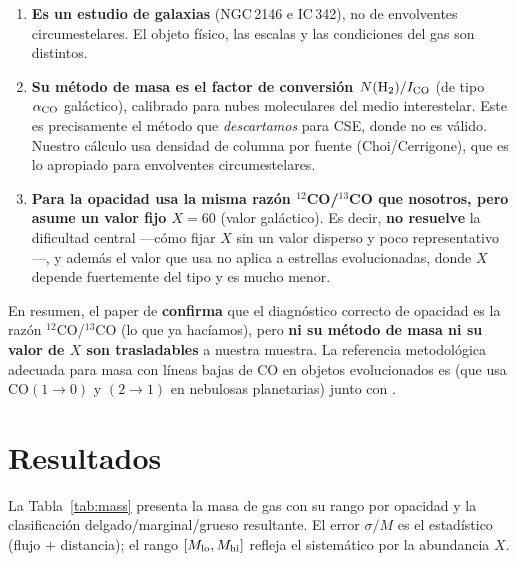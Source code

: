 \documentclass[12pt, a4paper]{article}
\begin{document}
\begin{enumerate}
    \item \textbf{Es un estudio de galaxias} (NGC\,2146 e IC\,342), no de envolventes
    circumestelares. El objeto físico, las escalas y las condiciones del gas son distintos.

    \item \textbf{Su método de masa es el factor de conversión $N({\rm H_2})/I_{\rm CO}$}
    (de tipo $\alpha_{\rm CO}$ galáctico), calibrado para nubes moleculares del medio
    interestelar. Este es precisamente el método que \emph{descartamos} para CSE, donde no es
    válido. Nuestro cálculo usa densidad de columna por fuente (Choi/Cerrigone), que es lo
    apropiado para envolventes circumestelares.

    \item \textbf{Para la opacidad usa la misma razón $^{12}$CO/$^{13}$CO que nosotros, pero
    asume un valor fijo $X=60$} (valor galáctico). Es decir, \textbf{no resuelve} la dificultad
    central —cómo fijar $X$ sin un valor disperso y poco representativo—, y además el valor que
    usa no aplica a estrellas evolucionadas, donde $X$ depende fuertemente del tipo y es mucho
    menor.
\end{enumerate}

\noindent En resumen, el paper de \citet{xie1994} \textbf{confirma} que el diagnóstico correcto
de opacidad es la razón $^{12}$CO/$^{13}$CO (lo que ya hacíamos), pero \textbf{ni su método de
masa ni su valor de $X$ son trasladables} a nuestra muestra. La referencia metodológica
adecuada para masa con líneas bajas de CO en objetos evolucionados es \citet{huggins1996}
(que usa CO$(1\to0)$ y $(2\to1)$ en nebulosas planetarias) junto con \citet{mangum2015}.

\section{Resultados}

La Tabla~\ref{tab:mass} presenta la masa de gas con su rango por opacidad y la clasificación
delgado/marginal/grueso resultante. El error $\sigma/M$ es el estadístico (flujo $+$ distancia);
el rango $[M_{\rm lo},M_{\rm hi}]$ refleja el sistemático por la abundancia $X$.
\end{document}

